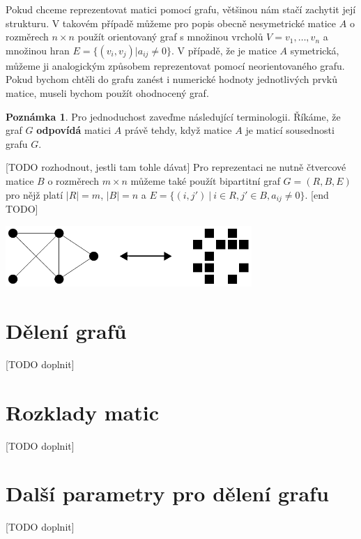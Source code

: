 \documentclass[11pt,american,czech,oneside]{book}
\theoremstyle{plain}
\theoremstyle{definition}
\newtheorem{remark}{Poznámka}
\begin{document}
Pokud chceme reprezentovat matici pomocí grafu, většinou nám stačí zachytit její strukturu. V takovém případě můžeme pro popis obecně nesymetrické matice $A$ o rozměrech $n \times n$ použít orientovaný graf s množinou vrcholů $V = {v_1,\ldots,v_n}$ a množinou hran $E =\{(v_i,v_j)|a_{ij}\neq 0\}$. V případě, že je matice $A$ symetrická, můžeme ji analogickým způsobem reprezentovat pomocí neorientovaného grafu.
Pokud bychom chtěli do grafu zanést i numerické hodnoty jednotlivých prvků matice, museli bychom použít ohodnocený graf.

\begin{remark}
  Pro jednoduchost zaveďme následující terminologii. Říkáme, že graf $G$ \textbf{odpovídá} matici $A$ právě tehdy, když matice $A$ je maticí sousednosti grafu $G$.
\end{remark}

[TODO rozhodnout, jestli tam tohle dávat]
Pro reprezentaci ne nutně čtvercové matice $B$ o rozměrech $m\times n$ můžeme také použít bipartitní graf $G=(R,B,E)$ pro nějž platí $|R|=m$, $|B|=n$ a $E = \{(i,j') \ | \ i \in R, j' \in B, a_{ij} \neq 0 \}$.
[end TODO]

\bigskip
{
  \label{MatGrPicture}
  \centering
  \includegraphics[width=0.7\textwidth]{pictures/matgr.pdf}
}


\chapter{Dělení grafů}
[TODO doplnit]


\chapter{Rozklady matic}
[TODO doplnit]


\chapter{Další parametry pro dělení grafu}
[TODO doplnit]
\end{document}

